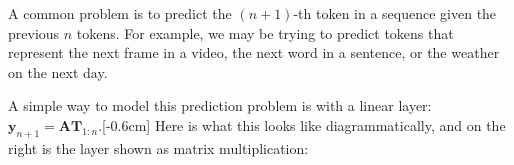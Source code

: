 A common problem is to predict the $(n+1)$-th token in a sequence given the previous $n$ tokens. For example, we may be trying to predict tokens that represent the next frame in a video, the next word in a sentence, or the weather on the next day.

A simple way to model this prediction problem is with a linear layer: $\mathbf{y}_{n+1} = \mathbf{A}\mathbf{T}_{1:n}$.[-0.6cm]
Here is what this looks like diagrammatically, and on the right is the layer shown as matrix multiplication:
